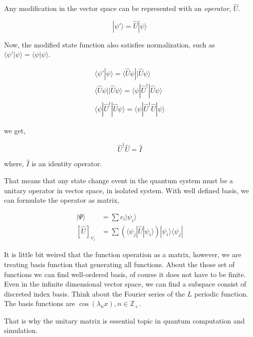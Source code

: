 \documentclass[10pt]{article}
\begin{document}
Any modification in the vector space can be represented with an \textit{operator}, $\hat{U}$.

\begin{equation}
    |\psi' \rangle = \hat{U} | \psi \rangle
\end{equation}

Now, the modified state function also satisfies normalization, such as $\langle \psi' | \psi \rangle = \langle \psi | \psi \rangle$.

\begin{eqnarray*}
    \langle \psi' | \psi \rangle = \langle \hat{U} \psi | |\hat{U} \psi \rangle \\ 
    \langle \hat{U} \psi | |\hat{U} \psi \rangle = \langle  \psi| \hat{U}^{\dagger}|\hat{U} \psi \rangle\\
    \langle \psi| \hat{U}^{\dagger}|\hat{U} \psi \rangle = \langle \psi| \hat{U}^{\dagger}\hat{U}| \psi \rangle
\end{eqnarray*}

we get,

\begin{equation}
    \label{eq:unitary}
    \hat{U}^\dagger \hat{U} = \hat{I}
\end{equation}

where, $\hat{I}$ is an identity operator. 

That means that any state change event in the quantum system must be a unitary operator in vector space, in isolated system.
With well defined basis, we can formulate the operator as matrix, 

\begin{eqnarray*}
    {|\Psi \rangle} &= {\sum c_i |\psi_i \rangle} \\
    {[\hat{U}]}_{\psi_i} &= \sum (\langle \psi_j | \hat{U} |\psi_i \rangle) |\psi_i \rangle \langle \psi_j|
\end{eqnarray*}

It is little bit weired that the function operation as a matrix, however, we are treating basis function that generating all functions.
About the those set of functions we can find well-ordered basis, of course it does not have to be finite.
Even in the infinite dimensional vector space, we can find a subspace consist of discreted index basis.
Think about the Fourier series of the $L$ periodic function. 
The basis functions are $\cos(\lambda_n x), n \in \mathbb{Z}_+ $.

That is why the unitary matrix is essential topic in quantum computation and simulation.
\end{document}
